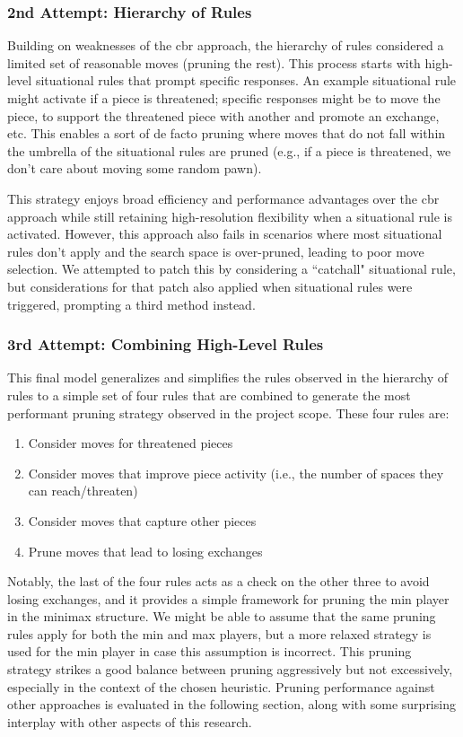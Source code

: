 \documentclass[letterpaper]{article}
\begin{document}
\subsubsection{2nd Attempt: Hierarchy of Rules}
Building on weaknesses of the \acrshort{cbr} approach, the hierarchy of rules considered a limited set of reasonable moves (pruning the rest).  This process starts with high-level situational rules that prompt specific responses.  An example situational rule might activate if a piece is threatened; specific responses might be to move the piece, to support the threatened piece with another and promote an exchange, etc.  This enables a sort of de facto pruning where moves that do not fall within the umbrella of the situational rules are pruned (e.g., if a piece is threatened, we don't care about moving some random pawn).

This strategy enjoys broad efficiency and performance advantages over the \acrshort{cbr} approach while still retaining high-resolution flexibility when a situational rule is activated.  However, this approach also fails in scenarios where most situational rules don't apply and the search space is over-pruned, leading to poor move selection.  We attempted to patch this by considering a ``catchall" situational rule, but considerations for that patch also applied when situational rules were triggered, prompting a third method instead.

\subsubsection{3rd Attempt: Combining High-Level Rules}
This final model generalizes and simplifies the rules observed in the hierarchy of rules to a simple set of four rules that are combined to generate the most performant pruning strategy observed in the project scope.  These four rules are:
\begin{enumerate}
    \item Consider moves for threatened pieces
    \item Consider moves that improve piece activity (i.e., the number of spaces they can reach/threaten)
    \item Consider moves that capture other pieces
    \item Prune moves that lead to losing exchanges
\end{enumerate}
Notably, the last of the four rules acts as a check on the other three to avoid losing exchanges, and it provides a simple framework for pruning the min player in the minimax structure.  We might be able to assume that the same pruning rules apply for both the min and max players, but a more relaxed strategy is used for the min player in case this assumption is incorrect.  This pruning strategy strikes a good balance between pruning aggressively but not excessively, especially in the context of the chosen heuristic.  Pruning performance against other approaches is evaluated in the following section, along with some surprising interplay with other aspects of this research.
\end{document}
